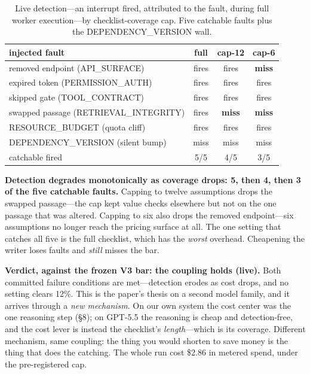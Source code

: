 \documentclass[acmsmall,screen]{acmart}
\begin{document}
\begin{table}[t]
\caption{Live detection---an interrupt fired, attributed to the fault, during
full worker execution---by checklist-coverage cap. Five catchable faults plus the
DEPENDENCY\_VERSION wall.}
\label{tab:v3-detection}
\begin{tabular}{lccc}
\toprule
injected fault & full & cap-12 & cap-6 \\
\midrule
removed endpoint (API\_SURFACE)        & fires & fires & \textbf{miss} \\
expired token (PERMISSION\_AUTH)       & fires & fires & fires \\
skipped gate (TOOL\_CONTRACT)          & fires & fires & fires \\
swapped passage (RETRIEVAL\_INTEGRITY) & fires & \textbf{miss} & \textbf{miss} \\
RESOURCE\_BUDGET (quota cliff)         & fires & fires & fires \\
DEPENDENCY\_VERSION (silent bump)      & miss  & miss  & miss  \\
\midrule
catchable fired                        & 5/5   & 4/5   & 3/5   \\
\bottomrule
\end{tabular}
\end{table}

\textbf{Detection degrades monotonically as coverage drops: 5, then 4, then 3 of
the five catchable faults.} Capping to twelve assumptions drops the swapped
passage---the cap kept value checks elsewhere but not on the one passage that was
altered. Capping to six also drops the removed endpoint---six assumptions no
longer reach the pricing surface at all. The one setting that catches all five is
the full checklist, which has the \emph{worst} overhead. Cheapening the writer
loses faults and \emph{still} misses the bar.

\textbf{Verdict, against the frozen V3 bar: the coupling holds (live).} Both
committed failure conditions are met---detection erodes as cost drops, and no
setting clears 12\%. This is the paper's thesis on a second model family, and it
arrives through a \emph{new mechanism}. On our own system the cost center was the
one reasoning step (\S8); on GPT-5.5 the reasoning is cheap and detection-free,
and the cost lever is instead the checklist's \emph{length}---which is its
coverage. Different mechanism, same coupling: the thing you would shorten to save
money is the thing that does the catching. The whole run cost \$2.86 in
metered spend, under the pre-registered cap.
\end{document}
